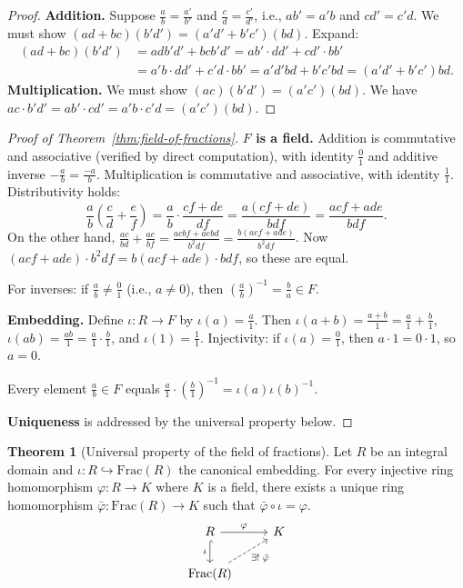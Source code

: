 \documentclass[12pt,a4paper,openany]{book}
\theoremstyle{definition}
\newtheorem{theorem}{Theorem}[chapter]
\theoremstyle{remark}
\begin{document}
\begin{proof}
\textbf{Addition.} Suppose $\frac{a}{b}=\frac{a'}{b'}$ and $\frac{c}{d}=\frac{c'}{d'}$, i.e., $ab'=a'b$ and $cd'=c'd$. We must show $(ad+bc)(b'd')=(a'd'+b'c')(bd)$. Expand:
\begin{align*}
    (ad+bc)(b'd') &= adb'd' + bcb'd' = ab'\cdot dd' + cd'\cdot bb' \\
    &= a'b\cdot dd' + c'd\cdot bb' = a'd'bd + b'c'bd = (a'd'+b'c')bd.
\end{align*}
\textbf{Multiplication.} We must show $(ac)(b'd')=(a'c')(bd)$. We have $ac\cdot b'd'=ab'\cdot cd'=a'b\cdot c'd=(a'c')(bd)$.
\end{proof}

\begin{proof}[Proof of Theorem~\ref{thm:field-of-fractions}]
\textbf{$F$ is a field.} Addition is commutative and associative (verified by direct computation), with identity $\frac{0}{1}$ and additive inverse $-\frac{a}{b}=\frac{-a}{b}$. Multiplication is commutative and associative, with identity $\frac{1}{1}$. Distributivity holds:
\[
    \frac{a}{b}\left(\frac{c}{d}+\frac{e}{f}\right) = \frac{a}{b}\cdot\frac{cf+de}{df} = \frac{a(cf+de)}{bdf} = \frac{acf+ade}{bdf}.
\]
On the other hand, $\frac{ac}{bd}+\frac{ae}{bf}=\frac{acbf+aebd}{b^2df}=\frac{b(acf+ade)}{b^2df}$. Now $(acf+ade)\cdot b^2df = b(acf+ade)\cdot bdf$, so these are equal.

For inverses: if $\frac{a}{b}\neq\frac{0}{1}$ (i.e., $a\neq 0$), then $\left(\frac{a}{b}\right)^{-1}=\frac{b}{a}\in F$.

\textbf{Embedding.} Define $\iota\colon R\to F$ by $\iota(a)=\frac{a}{1}$. Then $\iota(a+b)=\frac{a+b}{1}=\frac{a}{1}+\frac{b}{1}$, $\iota(ab)=\frac{ab}{1}=\frac{a}{1}\cdot\frac{b}{1}$, and $\iota(1)=\frac{1}{1}$. Injectivity: if $\iota(a)=\frac{0}{1}$, then $a\cdot 1=0\cdot 1$, so $a=0$.

Every element $\frac{a}{b}\in F$ equals $\frac{a}{1}\cdot\left(\frac{b}{1}\right)^{-1}=\iota(a)\iota(b)^{-1}$.

\textbf{Uniqueness} is addressed by the universal property below.
\end{proof}

\begin{theorem}[Universal property of the field of fractions]\label{thm:frac-universal}
Let $R$ be an integral domain and $\iota\colon R\hookrightarrow\mathrm{Frac}(R)$ the canonical embedding. For every injective ring homomorphism $\varphi\colon R\to K$ where $K$ is a field, there exists a unique ring homomorphism $\bar{\varphi}\colon\mathrm{Frac}(R)\to K$ such that $\bar{\varphi}\circ\iota=\varphi$.
\[
\begin{tikzcd}
    R \arrow[r, "\varphi"] \arrow[d, hook, "\iota"'] & K \\
    \mathrm{Frac}(R) \arrow[ur, "\exists!\;\bar{\varphi}"', dashed] &
\end{tikzcd}
\]
\end{theorem}
\end{document}
